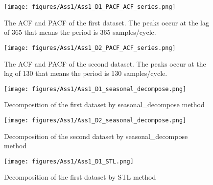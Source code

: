 \begin{figure}[H]
    \centering
    \begin{minipage}[b]{1\textwidth}
        \texttt{[image: figures/Ass1/Ass1\_D1\_PACF\_ACF\_series.png]}
    \end{minipage}
    \caption{The \gls{ACF} and \gls{PACF} of the first dataset. The peaks occur at the lag of 365 that means the period is 365 samples/cycle.}
    \label{fig:Ass1_D1_PACF_ACF_series}
\end{figure}

\begin{figure}[H]
    \centering
    \begin{minipage}[b]{1\textwidth}
        \texttt{[image: figures/Ass1/Ass1\_D2\_PACF\_ACF\_series.png]}
    \end{minipage}
    \caption{The \gls{ACF} and \gls{PACF} of the second dataset. The peaks occur at the lag of 130 that means the period is 130 samples/cycle.}
    \label{fig:Ass1_D2_PACF_ACF_series}
\end{figure}


\begin{figure}[H]
    \centering
    \begin{minipage}[b]{1\textwidth}
        \texttt{[image: figures/Ass1/Ass1\_D1\_seasonal\_decompose.png]}
    \end{minipage}
    \caption{Decomposition of the first dataset by seasonal\_decompose method}
    \label{fig:Ass1_D1_seasonal_decompose}
\end{figure}

\begin{figure}[H]
    \centering
    \begin{minipage}[b]{1\textwidth}
        \texttt{[image: figures/Ass1/Ass1\_D2\_seasonal\_decompose.png]}
    \end{minipage}
    \caption{Decomposition of the second dataset by seasonal\_decompose method}
    \label{fig:Ass1_D2_seasonal_decompose}
\end{figure}

\begin{figure}[H]
    \centering
    \begin{minipage}[b]{1\textwidth}
        \texttt{[image: figures/Ass1/Ass1\_D1\_STL.png]}
    \end{minipage}
    \caption{Decomposition of the first dataset by STL method}
    \label{fig:Ass1_D1_STL}
\end{figure}

